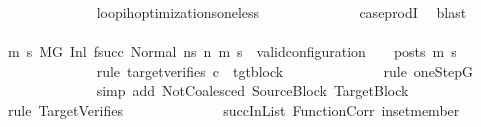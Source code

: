 \begin{isabellebody}
\ \ \ \ \ \ \ \ \ \ \ \ \isamarkupfalse%
\ loop{\isacharunderscore}{\kern0pt}ih{\isacharunderscore}{\kern0pt}optimizations{\isacharunderscore}{\kern0pt}one{\isacharunderscore}{\kern0pt}less\isanewline
\ \ \ \ \ \ \ \ \ \ \ \ \isamarkupfalse%
\ case{\isacharunderscore}{\kern0pt}prodI{}\ \isamarkupfalse%
\ blast\isanewline
\ \ \ \ \ \ \ \ \ \ \isamarkupfalse%
\ {\isachardoublequoteopen}{\isasymforall}m{}{\isacharprime}{\kern0pt}\ s{}{\isacharprime}{\kern0pt}{\isachardot}{\kern0pt}{\isacharparenleft}{\kern0pt}\ M{\isacharcomma}{\kern0pt}{\isasymLambda}{\isacharcomma}{\kern0pt}{\isasymGamma}{\isacharcomma}{\kern0pt}{\isasymOmega}{\isacharcomma}{\kern0pt}G{\isacharprime}{\kern0pt}\ {\isasymturnstile}{\isacharparenleft}{\kern0pt}Inl\ {\isacharparenleft}{\kern0pt}f{\isacharparenleft}{\kern0pt}succ{\isacharparenright}{\kern0pt}{\isacharparenright}{\kern0pt}{\isacharcomma}{\kern0pt}\ Normal\ ns{\isacharprime}{\kern0pt}{\isacharparenright}{\kern0pt}\ {\isacharminus}{\kern0pt}n{\isasymrightarrow}{\isacharasterisk}{\kern0pt}\ {\isacharparenleft}{\kern0pt}m{}{\isacharprime}{\kern0pt}{\isacharcomma}{\kern0pt}\ s{}{\isacharprime}{\kern0pt}{\isacharparenright}{\kern0pt}{\isacharparenright}{\kern0pt}\ {\isasymlongrightarrow}\ valid{\isacharunderscore}{\kern0pt}configuration\ {\isasymLambda}\ {\isasymGamma}\ {\isasymOmega}\ posts\ m{}{\isacharprime}{\kern0pt}\ s{}{\isacharprime}{\kern0pt}{\isachardoublequoteclose}\isanewline
\ \ \ \ \ \ \ \ \ \ \ \ \isamarkupfalse%
\ {\isacharparenleft}{\kern0pt}rule\ target{\isacharunderscore}{\kern0pt}verifies{\isacharbrackleft}{\kern0pt}\ {\isacharquery}{\kern0pt}c\ {\isacharequal}{\kern0pt}\ tgt{\isacharunderscore}{\kern0pt}block{\isacharbrackright}{\kern0pt}{\isacharparenright}{\kern0pt}\isanewline
\ \ \ \ \ \ \ \ \ \ \ \ \isamarkupfalse%
\ {\isacharparenleft}{\kern0pt}rule\ oneStepG{\isacharparenright}{\kern0pt}\isanewline
\ \ \ \ \ \ \ \ \ \ \ \ \isamarkupfalse%
\ {\isacharparenleft}{\kern0pt}simp\ add{\isacharcolon}{\kern0pt}\ NotCoalesced\ SourceBlock\ TargetBlock{\isacharparenright}{\kern0pt}\isanewline
\ \ \ \ \ \ \ \ \ \ \ \ \isamarkupfalse%
\ {\isacharparenleft}{\kern0pt}rule\ TargetVerifies{\isacharparenright}{\kern0pt}\isanewline
\ \ \ \ \ \ \ \ \ \ \ \ \isamarkupfalse%
\ succInList\ FunctionCorr\ in{\isacharunderscore}{\kern0pt}set{\isacharunderscore}{\kern0pt}member\ \isamarkupfalse%

\end{isabellebody}
